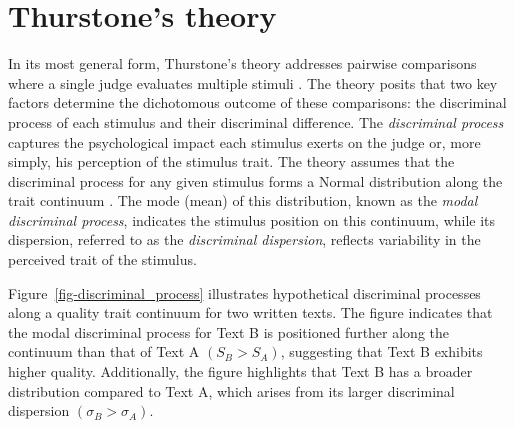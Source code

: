 \documentclass[
  authoryear,
  preprint,
  1p]{elsarticle}
\begin{document}
\section{Thurstone's theory}\label{sec-thurstone_theory}

In its most general form, Thurstone's theory addresses pairwise
comparisons where a single judge evaluates multiple stimuli
\citep[pp.~267]{Thurstone_1927b}. The theory posits that two key factors
determine the dichotomous outcome of these comparisons: the discriminal
process of each stimulus and their discriminal difference. The
\emph{discriminal process} captures the psychological impact each
stimulus exerts on the judge or, more simply, his perception of the
stimulus trait. The theory assumes that the discriminal process for any
given stimulus forms a Normal distribution along the trait continuum
\citep[pp.~266]{Thurstone_1927b}. The mode (mean) of this distribution,
known as the \emph{modal discriminal process}, indicates the stimulus
position on this continuum, while its dispersion, referred to as the
\emph{discriminal dispersion}, reflects variability in the perceived
trait of the stimulus.

Figure~\ref{fig-discriminal_process} illustrates hypothetical
discriminal processes along a quality trait continuum for two written
texts. The figure indicates that the modal discriminal process for Text
B is positioned further along the continuum than that of Text A
\((S_{B} > S_{A})\), suggesting that Text B exhibits higher quality.
Additionally, the figure highlights that Text B has a broader
distribution compared to Text A, which arises from its larger
discriminal dispersion \((\sigma_{B} > \sigma_{A})\).
\end{document}
